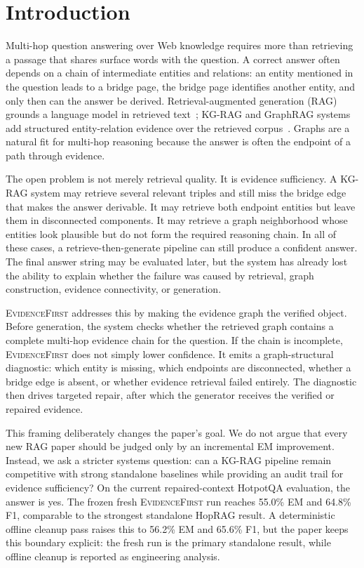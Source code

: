 \documentclass[runningheads]{llncs}
\newcommand{\sys}{\textsc{EvidenceFirst}\xspace}
\begin{document}
\section{Introduction}
\label{sec:intro}

Multi-hop question answering over Web knowledge requires more than retrieving
a passage that shares surface words with the question. A correct answer often
depends on a chain of intermediate entities and relations: an entity mentioned
in the question leads to a bridge page, the bridge page identifies another
entity, and only then can the answer be derived. Retrieval-augmented generation
(RAG) grounds a language model in retrieved text~\cite{lewis2020rag}; KG-RAG
and GraphRAG systems add structured entity-relation evidence over the retrieved
corpus~\cite{edge2024graphrag,guo2024lightrag,han2025graphragsurvey}. Graphs
are a natural fit for multi-hop reasoning because the answer is often the
endpoint of a path through evidence.

The open problem is not merely retrieval quality. It is evidence sufficiency.
A KG-RAG system may retrieve several relevant triples and still miss the bridge
edge that makes the answer derivable. It may retrieve both endpoint entities
but leave them in disconnected components. It may retrieve a graph neighborhood
whose entities look plausible but do not form the required reasoning chain.
In all of these cases, a retrieve-then-generate pipeline can still produce a
confident answer. The final answer string may be evaluated later, but the
system has already lost the ability to explain whether the failure was caused
by retrieval, graph construction, evidence connectivity, or generation.

\sys addresses this by making the evidence graph the verified object. Before
generation, the system checks whether the retrieved graph contains a complete
multi-hop evidence chain for the question. If the chain is incomplete, \sys
does not simply lower confidence. It emits a graph-structural diagnostic:
which entity is missing, which endpoints are disconnected, whether a bridge
edge is absent, or whether evidence retrieval failed entirely. The diagnostic
then drives targeted repair, after which the generator receives the verified
or repaired evidence.

This framing deliberately changes the paper's goal. We do not argue that every
new RAG paper should be judged only by an incremental EM improvement. Instead,
we ask a stricter systems question: can a KG-RAG pipeline remain competitive
with strong standalone baselines while providing an audit trail for evidence
sufficiency? On the current repaired-context HotpotQA evaluation, the answer is
yes. The frozen fresh \sys run reaches 55.0\% EM and 64.8\% F1, comparable to
the strongest standalone HopRAG result. A deterministic offline cleanup pass
raises this to 56.2\% EM and 65.6\% F1, but the paper keeps this boundary
explicit: the fresh run is the primary standalone result, while offline cleanup
is reported as engineering analysis.
\end{document}
